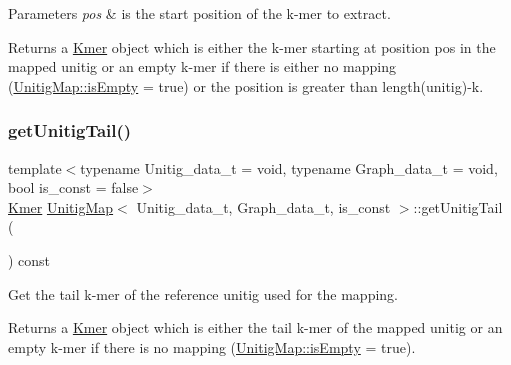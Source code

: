 \begin{DoxyParams}{Parameters}
{\em pos} & is the start position of the k-\/mer to extract. \\
\hline
\end{DoxyParams}
\begin{DoxyReturn}{Returns}
a \hyperlink{classKmer}{Kmer} object which is either the k-\/mer starting at position pos in the mapped unitig or an empty k-\/mer if there is either no mapping (\hyperlink{structUnitigMapBase_ade629940b2611494dbf233cb1144da80}{Unitig\+Map\+::is\+Empty} = true) or the position is greater than length(unitig)-\/k. 
\end{DoxyReturn}
\mbox{\label{classUnitigMap_a584488d223cb2f5b00d72342305c6d0e}} 
\subsubsection{\texorpdfstring{get\+Unitig\+Tail()}{getUnitigTail()}}
{\footnotesize\ttfamily template$<$typename Unitig\+\_\+data\+\_\+t = void, typename Graph\+\_\+data\+\_\+t = void, bool is\+\_\+const = false$>$ \\
\hyperlink{classKmer}{Kmer} \hyperlink{classUnitigMap}{Unitig\+Map}$<$ Unitig\+\_\+data\+\_\+t, Graph\+\_\+data\+\_\+t, is\+\_\+const $>$\+::get\+Unitig\+Tail (\begin{DoxyParamCaption}{ }\end{DoxyParamCaption}) const}



Get the tail k-\/mer of the reference unitig used for the mapping. 

\begin{DoxyReturn}{Returns}
a \hyperlink{classKmer}{Kmer} object which is either the tail k-\/mer of the mapped unitig or an empty k-\/mer if there is no mapping (\hyperlink{structUnitigMapBase_ade629940b2611494dbf233cb1144da80}{Unitig\+Map\+::is\+Empty} = true). 
\end{DoxyReturn}
\mbox{\label{classUnitigMap_a2a80f5a0f55391c57b4f4d83400e30a2}} 
